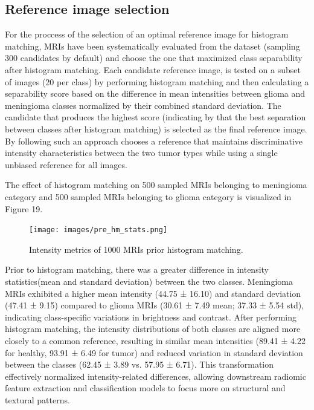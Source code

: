 \documentclass[11pt,a4paper]{article}
\begin{document}
\subsection{Reference image selection}

For the proccess of the selection of an optimal reference image for histogram matching, MRIs have been systematically evaluated
from the dataset (sampling 300 candidates by default) and choose the one that maximized class separability after histogram matching.
Each candidate reference image, is tested on a subset of images (20 per class) 
by performing histogram matching and then calculating a separability score based on the 
difference in mean intensities between glioma and meningioma classes 
normalized by their combined standard deviation. The candidate that produces the highest score (indicating by that
the best separation between classes after histogram matching) is selected as the final reference image. 
By following such an approach chooses a reference that maintains discriminative 
intensity characteristics between the two tumor types while using a single unbiased 
reference for all images.

The effect of histogram matching on 500 sampled MRIs belonging to meningioma category and 500 sampled MRIs belonging to glioma category is 
visualized in Figure 19.

		\begin{figure}[H]
			\centering
			\texttt{[image: images/pre\_hm\_stats.png]}
			\caption{Intensity metrics of 1000 MRIs prior histogram matching.}
			\label{fig1:}
		\end{figure}		

Prior to histogram matching, there was a greater difference in intensity statistics(mean and standard deviation)
between the two classes. 
Meningioma MRIs exhibited a higher mean intensity (44.75 ± 16.10) and 
standard deviation (47.41 ± 9.15) compared to glioma MRIs (30.61 ± 7.49 mean; 37.33 ± 5.54 std), 
indicating class-specific variations in brightness and contrast. 
After performing histogram matching, the intensity distributions of both classes are aligned more closely 
to a common reference, resulting in similar mean intensities (89.41 ± 4.22 for healthy, 93.91 ± 6.49 for tumor) 
and reduced variation in standard deviation between the classes (62.45 ± 3.89 vs. 57.95 ± 6.71). 
This transformation effectively normalized intensity-related differences, allowing downstream radiomic feature 
extraction and classification models to focus more on structural and textural patterns.
\end{document}
